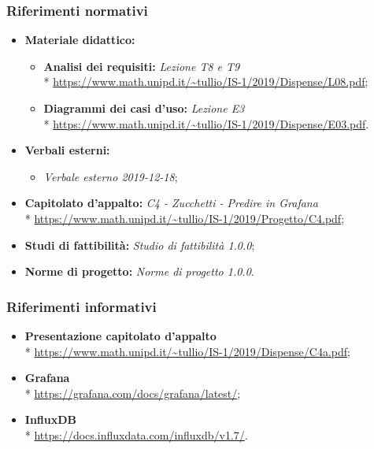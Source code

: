 \documentclass[a4]{article}
\begin{document}
			\subsubsection{Riferimenti normativi}
				\begin{itemize}
					\item \textbf{Materiale didattico:}
					\begin{itemize}
						\item \textbf{Analisi dei requisiti:} \textit{Lezione T8 e T9} \\*
							\url{https://www.math.unipd.it/~tullio/IS-1/2019/Dispense/L08.pdf};
						\item \textbf{Diagrammi dei casi d'uso:} \textit{Lezione E3} \\*
							\url{https://www.math.unipd.it/~tullio/IS-1/2019/Dispense/E03.pdf}.
					\end{itemize}
					\item \textbf{Verbali esterni:} 
					\begin{itemize}
						\item \textit{Verbale esterno 2019-12-18};
					\end{itemize}
					\item \textbf{Capitolato d'appalto:} \textit{C4 - Zucchetti - Predire in Grafana} \\*
						\url{https://www.math.unipd.it/~tullio/IS-1/2019/Progetto/C4.pdf};
					\item \textbf{Studi di fattibilità:} \textit{Studio di fattibilità 1.0.0};
					\item \textbf{Norme di progetto:} \textit{Norme di progetto 1.0.0}.
				\end{itemize}
			\subsubsection{Riferimenti informativi}
				\begin{itemize}
					\item \textbf{Presentazione capitolato d'appalto} \\*
						\url{https://www.math.unipd.it/~tullio/IS-1/2019/Dispense/C4a.pdf};
					\item \textbf{Grafana} \\*
						\url{https://grafana.com/docs/grafana/latest/};
					\item \textbf{InfluxDB} \\*
						\url{https://docs.influxdata.com/influxdb/v1.7/}.
		
				\end{itemize}
\end{document}

